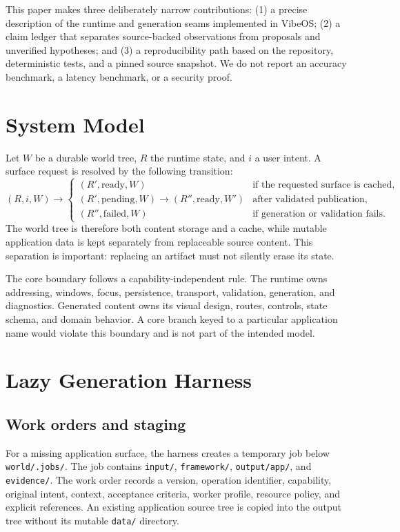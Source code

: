 \documentclass[11pt]{article}
\begin{document}
This paper makes three deliberately narrow contributions: (1) a precise description of the runtime and generation seams implemented in VibeOS; (2) a claim ledger that separates source-backed observations from proposals and unverified hypotheses; and (3) a reproducibility path based on the repository, deterministic tests, and a pinned source snapshot. We do not report an accuracy benchmark, a latency benchmark, or a security proof.

\section{System Model}
Let $W$ be a durable world tree, $R$ the runtime state, and $i$ a user intent. A surface request is resolved by the following transition:
\begin{equation}
 (R,i,W) \rightarrow \begin{cases} (R',\mathrm{ready},W) & \text{if the requested surface is cached},\\
 (R',\mathrm{pending},W) \rightarrow (R'',\mathrm{ready},W') & \text{after validated publication},\\
 (R'',\mathrm{failed},W) & \text{if generation or validation fails.}
 \end{cases}
\end{equation}
The world tree is therefore both content storage and a cache, while mutable application data is kept separately from replaceable source content. This separation is important: replacing an artifact must not silently erase its state.

The core boundary follows a capability-independent rule. The runtime owns addressing, windows, focus, persistence, transport, validation, generation, and diagnostics. Generated content owns its visual design, routes, controls, state schema, and domain behavior. A core branch keyed to a particular application name would violate this boundary and is not part of the intended model.

\section{Lazy Generation Harness}
\subsection{Work orders and staging}
For a missing application surface, the harness creates a temporary job below \texttt{world/.jobs/}. The job contains \texttt{input/}, \texttt{framework/}, \texttt{output/app/}, and \texttt{evidence/}. The work order records a version, operation identifier, capability, original intent, context, acceptance criteria, worker profile, resource policy, and explicit references. An existing application source tree is copied into the output tree without its mutable \texttt{data/} directory.
\end{document}

